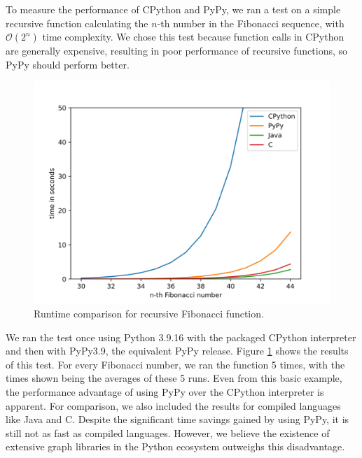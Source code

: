 To measure the performance of CPython and PyPy, we ran a test on a simple recursive function calculating the $n$-th number in the Fibonacci sequence, with $\mathcal{O}(2^n)$ time complexity. We chose this test because function calls in CPython are generally expensive, resulting in poor performance of recursive functions, so PyPy should perform better.

\begin{figure}[H]
\begin{center}
\includegraphics[scale=0.8,keepaspectratio]{images/lang_comparison.jpg}
\end{center}
\caption{Runtime comparison for recursive Fibonacci function.}
\label{fig:lang_comparison}
\end{figure}

We ran the test once using Python 3.9.16 with the packaged CPython interpreter and then with PyPy3.9, the equivalent PyPy release. Figure \ref{fig:lang_comparison} shows the results of this test. For every Fibonacci number, we ran the function 5 times, with the times shown being the averages of these 5 runs. Even from this basic example, the performance advantage of using PyPy over the CPython interpreter is apparent. For comparison, we also included the results for compiled languages like Java and C. Despite the significant time savings gained by using PyPy, it is still not as fast as compiled languages. However, we believe the existence of extensive graph libraries in the Python ecosystem outweighs this disadvantage.

